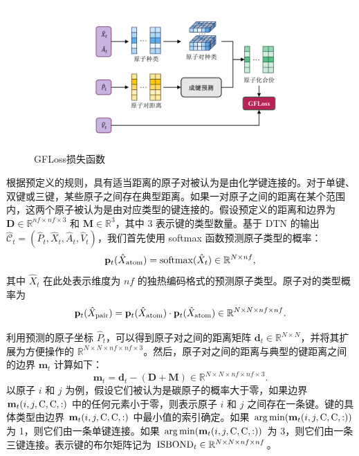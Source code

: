 \begin{figure}[h]
    \centering
    \includegraphics[width=\linewidth]{figures/gfloss.png}
    \caption{GFLoss损失函数}
    \label{fig:gfloss}
\end{figure} 

根据预定义的规则，具有适当距离的原子对被认为是由化学键连接的。对于单键、双键或三键，某些原子之间存在典型距离。如果一对原子之间的距离在某个范围内，这两个原子被认为是由对应类型的键连接的。假设预定义的距离和边界为 $\mathbf{D} \in \mathbb{R}^{nf \times nf \times 3}$ 和 $\mathbf{M} \in \mathbb{R}^{3}$，其中 3 表示键的类型数量。基于 DTN 的输出 $\hat{\mathcal{C}}_t = (\hat{P}_t, \hat{X}_t, \hat{A}_t, \hat{V}_t)$，我们首先使用 softmax 函数预测原子类型的概率：
\begin{equation}
    {\mathbf{p}}_t(\hat{X}_{{\rm atom}}) = {\rm softmax}(\hat{X}_t) \in \mathbb{R}^{N \times nf},
\end{equation}
其中 $\hat{X}_t$ 在此处表示维度为 $nf$ 的独热编码格式的预测原子类型。原子对的类型概率为
\begin{equation}
    {\mathbf{p}}_t(\hat{X}_{{\rm pair}}) = {\mathbf{p}}_t(\hat{X}_{{\rm atom}}) \cdot {\mathbf{p}}_t(\hat{X}_{{\rm atom}}) \in \mathbb{R}^{N \times N \times nf \times nf}.
\end{equation}

利用预测的原子坐标 $\hat{P}_t$，可以得到原子对之间的距离矩阵 $\mathbf{d}_t \in \mathbb{R}^{N \times N}$，并将其扩展为方便操作的 $\mathbb{R}^{N \times N \times nf \times nf \times 3}$。然后，原子对之间的距离与典型的键距离之间的边界 $\mathbf{m}_t$ 计算如下：
\begin{equation}
    \mathbf{m}_t = \mathbf{d}_t - (\mathbf{D} + \mathbf{M}) \in \mathbb{R}^{N \times N \times nf \times nf \times 3}.
\end{equation}
以原子 $i$ 和 $j$ 为例，假设它们被认为是碳原子的概率大于零，如果边界 $\mathbf{m}_t(i,j,{\rm C},{\rm C},:)$ 中的任何元素小于零，则表示原子 $i$ 和 $j$ 之间存在一条键。键的具体类型由边界 $\mathbf{m}_t(i,j,{\rm C},{\rm C},:)$ 中最小值的索引确定。如果 $\arg\min (\mathbf{m}_t(i,j,{\rm C},{\rm C},:))$ 为 1，则它们由一条单键连接。如果 $\arg\min (\mathbf{m}_t(i,j,{\rm C},{\rm C},:))$ 为 3，则它们由一条三键连接。表示键的布尔矩阵记为 ${\rm ISBOND}_t \in \mathbb{R}^{N \times N \times nf \times nf}$。

